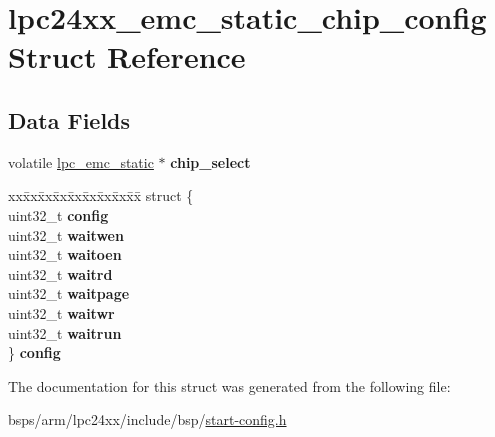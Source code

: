 \hypertarget{structlpc24xx__emc__static__chip__config}{}\section{lpc24xx\+\_\+emc\+\_\+static\+\_\+chip\+\_\+config Struct Reference}
\label{structlpc24xx__emc__static__chip__config}
\subsection*{Data Fields}
\begin{DoxyCompactItemize}
\item 
\mbox{\label{structlpc24xx__emc__static__chip__config_ae40817064d592b21d6fb1c76d3c16722}} 
volatile \mbox{\hyperlink{structlpc__emc__static}{lpc\+\_\+emc\+\_\+static}} $\ast$ {\bfseries chip\+\_\+select}
\item 
\mbox{\label{structlpc24xx__emc__static__chip__config_a6e3dcef7cf9bdb66caa109350bd812e0}} 
\begin{tabbing}
xx\=xx\=xx\=xx\=xx\=xx\=xx\=xx\=xx\=\kill
struct \{\\
\>uint32\_t {\bfseries config}\\
\>uint32\_t {\bfseries waitwen}\\
\>uint32\_t {\bfseries waitoen}\\
\>uint32\_t {\bfseries waitrd}\\
\>uint32\_t {\bfseries waitpage}\\
\>uint32\_t {\bfseries waitwr}\\
\>uint32\_t {\bfseries waitrun}\\
\} {\bfseries config}\\

\end{tabbing}\end{DoxyCompactItemize}


The documentation for this struct was generated from the following file\+:\begin{DoxyCompactItemize}
\item 
bsps/arm/lpc24xx/include/bsp/\mbox{\hyperlink{start-config_8h}{start-\/config.\+h}}\end{DoxyCompactItemize}
